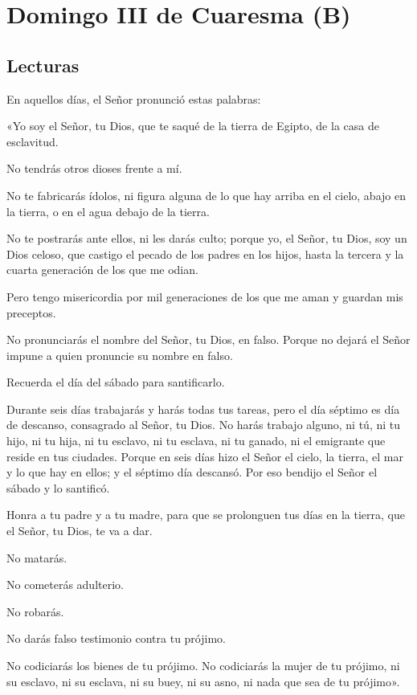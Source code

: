 \chapter{Domingo III de Cuaresma (B)}

\section{Lecturas}


 


\begin{scripture}
En aquellos días, el Señor pronunció estas palabras:

«Yo soy el Señor, tu Dios, que te saqué de la tierra de Egipto, de la casa de esclavitud.

No tendrás otros dioses frente a mí.

No te fabricarás ídolos, ni figura alguna de lo que hay arriba en el cielo, abajo en la tierra, o en el agua debajo de la tierra.

No te postrarás ante ellos, ni les darás culto; porque yo, el Señor, tu Dios, soy un Dios celoso, que castigo el pecado de los padres en los hijos, hasta la tercera y la cuarta generación de los que me odian.

Pero tengo misericordia por mil generaciones de los que me aman y guardan mis preceptos.

No pronunciarás el nombre del Señor, tu Dios, en falso. Porque no dejará el Señor impune a quien pronuncie su nombre en falso.
        
Recuerda el día del sábado para santificarlo. 

Durante seis días trabajarás y harás todas tus tareas, pero el día séptimo es día de descanso, consagrado al Señor, tu Dios. No harás trabajo alguno, ni tú, ni tu hijo, ni tu hija, ni tu esclavo, ni tu esclava, ni tu ganado, ni el emigrante que reside en tus ciudades. Porque en seis días hizo el Señor el cielo, la tierra, el mar y lo que hay en ellos; y el séptimo día descansó. Por eso bendijo el Señor el sábado y lo santificó.

Honra a tu padre y a tu madre, para que se prolonguen tus días en la tierra, que el Señor, tu Dios, te va a dar.

No matarás.

No cometerás adulterio.

No robarás.

No darás falso testimonio contra tu prójimo.

No codiciarás los bienes de tu prójimo. No codiciarás la mujer de tu prójimo, ni su esclavo, ni su esclava, ni su buey, ni su asno, ni nada que sea de tu prójimo».
\end{scripture}


